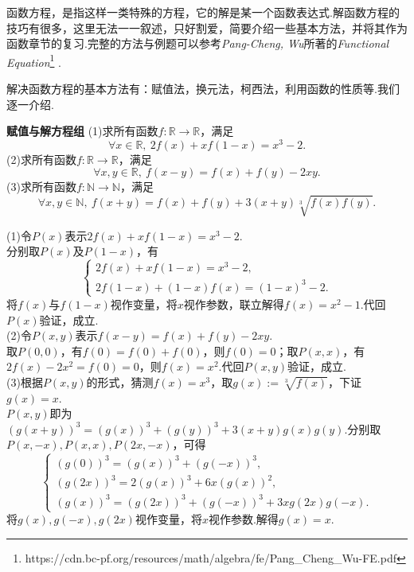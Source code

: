 \documentclass[lang=cn, zihao=5]{elegantbook}
\newcommand{\R}{\mathbb{R}}
\newcommand{\examplefont}[1]{\color{mgreen} \textbf{#1}}
\begin{document}
函数方程，是指这样一类特殊的方程，它的解是某一个函数表达式.解函数方程的技巧有很多，这里无法一一叙述，只好割爱，简要介绍一些基本方法，并将其作为函数章节的复习.完整的方法与例题可以参考\textit{Pang-Cheng, Wu}所著的\textit{Functional Equation}\footnote{https://cdn.bc-pf.org/resources/math/algebra/fe/Pang\_Cheng\_Wu-FE.pdf} .

解决函数方程的基本方法有：赋值法，换元法，柯西法，利用函数的性质等.我们逐一介绍.

\begin{example}{\examplefont{赋值与解方程组}}
	(1)求所有函数$f:\R \to \R$，满足$$\forall x \in \R ,~2f(x)+xf(1-x)=x^3-2.$$
	(2)求所有函数$f:\R \to \R$，满足$$\forall x,y \in \R,~f(x-y)=f(x)+f(y)-2xy.$$
	(3)求所有函数$f:\mathbb{N} \to \mathbb{N}$，满足$$\forall x,y \in \mathbb{N},~f(x+y)=f(x)+f(y)+3(x+y)\sqrt[3]{f(x)f(y)}.$$
\end{example}
\begin{solution}
	(1)令$P(x)$表示$2f(x)+xf(1-x)=x^3-2$. \\
	分别取$P(x)$及$P(1-x)$，有$$\begin{cases}
		2f(x)+xf(1-x)=x^3-2, \\
		2f(1-x)+(1-x)f(x)=(1-x)^3-2.
	\end{cases}$$
	将$f(x)$与$f(1-x)$视作变量，将$x$视作参数，联立解得$f(x)=x^2-1$.代回$P(x)$验证，成立. \\
	(2)令$P(x,y)$表示$f(x-y)=f(x)+f(y)-2xy$. \\
	取$P(0,0)$，有$f(0)=f(0)+f(0)$，则$f(0)=0$；取$P(x,x)$，有$2f(x)-2x^2=f(0)=0$，则$f(x)=x^2$.代回$P(x,y)$验证，成立. \\
	(3)根据$P(x,y)$的形式，猜测$f(x)=x^3$，取$g(x):=\sqrt[3]{f(x)}$，下证$g(x)=x$. \\
	$P(x,y)$即为$(g(x+y))^3=(g(x))^3+(g(y))^3+3(x+y)g(x)g(y)$.分别取$P(x,-x),P(x,x),P(2x,-x)$，可得$$\begin{cases}
		(g(0))^3 = (g(x))^3 + (g(-x))^3, \\
		(g(2x))^3 = 2(g(x))^3 + 6x(g(x))^2, \\
		(g(x))^3 = (g(2x))^3 + (g(-x))^3 + 3xg(2x)g(-x).
	\end{cases}$$
	将$g(x),g(-x),g(2x)$视作变量，将$x$视作参数.解得$g(x)=x$.
\end{solution}
\end{document}
